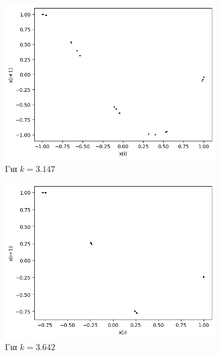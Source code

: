 \begin{figure}[ht]
\begin{subfigure}[b]{0.4\textwidth}
		\includegraphics[width=\textwidth]{LateX images/cheb q=0.8/g8}
		\caption{Για $k=3.147$}
		\label{f:k135}
	\end{subfigure}
	\hfill
	\begin{subfigure}[b]{0.4\textwidth}
		\centering
		\includegraphics[width=\textwidth]{LateX images/cheb q=0.8/g10}
		\caption{Για $k=3.642$}
		\label{f:k137}
	\end{subfigure}
	\hfill	
	\begin{subfigure}[b]{0.4\textwidth}
		\centering

\end{subfigure}
\end{figure}
